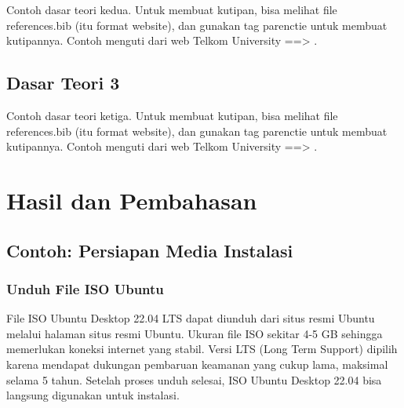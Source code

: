 \documentclass[letterpaper]{article}
\begin{document}
{\leftskip=1cm
    \hspace{1cm}Contoh dasar teori kedua. Untuk membuat kutipan, bisa melihat file references.bib (itu format website), dan gunakan tag parenctie untuk membuat kutipannya. Contoh menguti dari web Telkom University ==> \parencite{telkomSistemOperasi}.
    \par}
    
\subsection{Dasar Teori 3}
    
{\leftskip=1cm
    \hspace{1cm}Contoh dasar teori ketiga. Untuk membuat kutipan, bisa melihat file references.bib (itu format website), dan gunakan tag parenctie untuk membuat kutipannya. Contoh menguti dari web Telkom University ==> \parencite{telkomSistemOperasi}.
    \par}


\section{Hasil dan Pembahasan}



\subsection{Contoh: Persiapan Media Instalasi}


\subsubsection{Unduh File ISO Ubuntu}

{\leftskip=2cm
    \hspace{1cm}File ISO Ubuntu Desktop 22.04 LTS dapat diunduh dari situs resmi Ubuntu melalui halaman situs resmi Ubuntu. Ukuran file ISO sekitar 4-5 GB sehingga memerlukan koneksi internet yang stabil. Versi LTS (Long Term Support) dipilih karena mendapat dukungan pembaruan keamanan yang cukup lama, maksimal selama 5 tahun. Setelah proses unduh selesai, ISO Ubuntu Desktop 22.04 bisa langsung digunakan untuk instalasi.
    \par}
\end{document}
